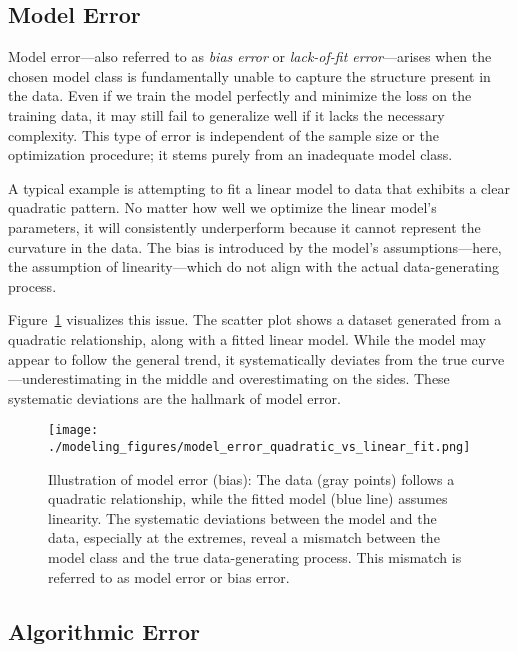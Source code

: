 \documentclass[12pt,openany]{book}
\begin{document}
\subsection{Model Error}

Model error—also referred to as \textit{bias error} or \textit{lack-of-fit error}—arises when the chosen model class is fundamentally unable to capture the structure present in the data. Even if we train the model perfectly and minimize the loss on the training data, it may still fail to generalize well if it lacks the necessary complexity. This type of error is independent of the sample size or the optimization procedure; it stems purely from an inadequate model class. \newline

A typical example is attempting to fit a linear model to data that exhibits a clear quadratic pattern. No matter how well we optimize the linear model's parameters, it will consistently underperform because it cannot represent the curvature in the data. The bias is introduced by the model’s assumptions—here, the assumption of linearity—which do not align with the actual data-generating process. \newline

Figure~\ref{fig:model-error-linear-fit} visualizes this issue. The scatter plot shows a dataset generated from a quadratic relationship, along with a fitted linear model. While the model may appear to follow the general trend, it systematically deviates from the true curve—underestimating in the middle and overestimating on the sides. These systematic deviations are the hallmark of model error.

\begin{figure}[H]
    \centering
    \texttt{[image: ./modeling\_figures/model\_error\_quadratic\_vs\_linear\_fit.png]}
    \caption{
    Illustration of model error (bias): The data (gray points) follows a quadratic relationship, while the fitted model (blue line) assumes linearity. The systematic deviations between the model and the data, especially at the extremes, reveal a mismatch between the model class and the true data-generating process. This mismatch is referred to as model error or bias error.
    }
    \label{fig:model-error-linear-fit}
\end{figure}


\subsection{Algorithmic Error}
\end{document}
